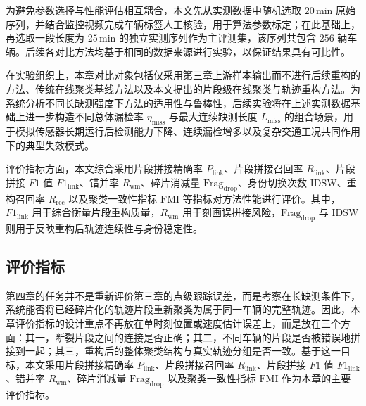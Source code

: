 \documentclass{xdupgthesis}
\begin{document}
为避免参数选择与性能评估相互耦合，本文先从实测数据中随机选取 $20\,\mathrm{min}$ 原始序列，并结合监控视频完成车辆标签人工核验，用于算法参数标定；在此基础上，再选取一段长度为 $25\,\mathrm{min}$ 的独立实测序列作为主评测集，该序列共包含 $256$ 辆车辆。后续各对比方法均基于相同的数据来源进行实验，以保证结果具有可比性。

在实验组织上，本章对比对象包括仅采用第三章上游样本输出而不进行后续重构的方法、传统在线聚类基线方法以及本文提出的片段级在线聚类与轨迹重构方法。为系统分析不同长缺测强度下方法的适用性与鲁棒性，后续实验将在上述实测数据基础上进一步构造不同总体漏检率 $\eta_{\mathrm{miss}}$ 与最大连续缺测长度 $L_{\mathrm{miss}}$ 的组合场景，用于模拟传感器长期运行后检测能力下降、连续漏检增多以及复杂交通工况共同作用下的典型失效模式。

评价指标方面，本文综合采用片段拼接精确率 $P_{\mathrm{link}}$、片段拼接召回率 $R_{\mathrm{link}}$、片段拼接 $F1$ 值 $F1_{\mathrm{link}}$、错并率 $R_{\mathrm{wm}}$、碎片消减量 $\mathrm{Frag}_{\mathrm{drop}}$、身份切换次数 $\mathrm{IDSW}$、重构召回率 $R_{\mathrm{rec}}$ 以及聚类一致性指标 $\mathrm{FMI}$ 等指标对方法性能进行评价。其中，$F1_{\mathrm{link}}$ 用于综合衡量片段重构质量，$R_{\mathrm{wm}}$ 用于刻画误拼接风险，$\mathrm{Frag}_{\mathrm{drop}}$ 与 $\mathrm{IDSW}$ 则用于反映重构后轨迹连续性与身份稳定性。

\subsection{评价指标}

第四章的任务并不是重新评价第三章的点级跟踪误差，而是考察在长缺测条件下，系统能否将已经碎片化的轨迹片段重新聚类为属于同一车辆的完整轨迹。因此，本章评价指标的设计重点不再放在单时刻位置或速度估计误差上，而是放在三个方面：其一，断裂片段之间的连接是否正确；其二，不同车辆的片段是否被错误地拼接到一起；其三，重构后的整体聚类结构与真实轨迹分组是否一致。基于这一目标，本文采用片段拼接精确率 $P_{\mathrm{link}}$、片段拼接召回率 $R_{\mathrm{link}}$、片段拼接 $F1$ 值 $F1_{\mathrm{link}}$、错并率 $R_{\mathrm{wm}}$、碎片消减量 $\mathrm{Frag}_{\mathrm{drop}}$ 以及聚类一致性指标 $\mathrm{FMI}$ 作为本章的主要评价指标。
\end{document}
